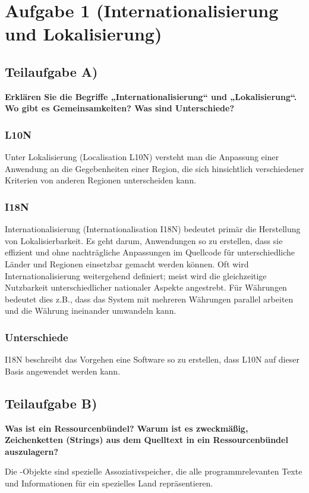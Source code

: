 \section{Aufgabe 1 (Internationalisierung und Lokalisierung)}

\subsection{Teilaufgabe A)}
\textbf{Erklären Sie die Begriffe „Internationalisierung“ und „Lokalisierung“. Wo gibt es
Gemeinsamkeiten? Was sind Unterschiede?}

\subsubsection{L10N}
Unter Lokalisierung (Localisation L10N) versteht man die Anpassung einer
Anwendung an die Gegebenheiten einer Region, die sich hinsichtlich
verschiedener Kriterien von anderen Regionen unterscheiden kann.

\subsubsection{I18N}
Internationalisierung (Internationalisation I18N) bedeutet primär die Herstellung
von Lokalisierbarkeit. Es geht darum, Anwendungen so zu erstellen, dass sie
effizient und ohne nachträgliche Anpassungen im Quellcode für unterschiedliche
Länder und Regionen einsetzbar gemacht werden können.
Oft wird Internationalisierung weitergehend definiert; meist wird die gleichzeitige
Nutzbarkeit unterschiedlicher nationaler Aspekte angestrebt. Für Währungen
bedeutet dies z.B., dass das System mit mehreren Währungen parallel arbeiten
und die Währung ineinander umwandeln kann. 

\subsubsection{Unterschiede}
I18N beschreibt das Vorgehen eine Software so zu erstellen, dass L10N auf dieser
Basis angewendet werden kann.

\subsection{Teilaufgabe B)}
\textbf{Was ist ein Ressourcenbündel? Warum ist es zweckmäßig, Zeichenketten (Strings) aus
dem Quelltext in ein Ressourcenbündel auszulagern?}

Die -Objekte sind spezielle Assoziativspeicher, die alle
programmrelevanten Texte und Informationen für ein spezielles Land
repräsentieren. 

